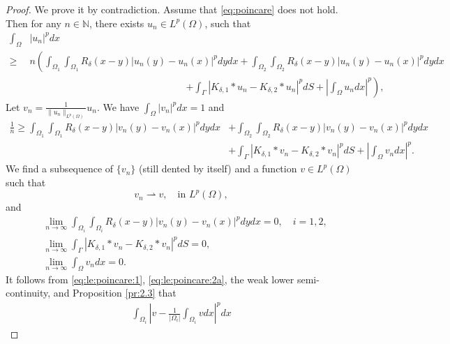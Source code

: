 \documentclass{article}
\theoremstyle{definition}
\begin{document}
\begin{proof}
  We prove it by contradiction. Assume that \eqref{eq:poincare} does not hold.
  Then for any $n\in\mathbb{N}$, there exists  $u_{n}\in L^p(\Omega)$, such that
  \begin{align*}
    \int_\Omega & |u_n|^pdx\\
    \geq &n
    \left(\int_{\Omega_1}\int_{\Omega_1}R_\delta(x-y)|u_{n}(y)-u_{n}(x)|^pdydx
    +\int_{\Omega_2}\int_{\Omega_2}R_\delta(x-y)|u_{n}(y)-u_{n}(x)|^pdydx\right.\\
    &\qquad\qquad\qquad\qquad\qquad\qquad\qquad\qquad
    \left.+\int_\Gamma\left|K_{\delta,1}\ast u_{n}-K_{\delta,2}\ast u_{n}\right|^pdS
    +\left|\int_{\Omega} u_ndx\right|^p \right),
  \end{align*}
  Let $v_{n}=\frac{1}{\|u_n\|_{L^p(\Omega)}} u_{n}$.
  We have $\int_{\Omega}|v_{n}|^pdx=1$
  and
    \begin{align*}
    \frac{1}{n}
    \geq
    \int_{\Omega_1}\int_{\Omega_1}R_\delta(x-y)|v_{n}(y)-v_{n}(x)|^pdydx
    &+\int_{\Omega_2}\int_{\Omega_2}R_\delta(x-y)|v_{n}(y)-v_{n}(x)|^pdydx\\
    &+\int_\Gamma\left|K_{\delta,1}\ast v_{n}-K_{\delta,2}\ast v_{n}\right|^pdS
    +\left|\int_{\Omega} v_ndx\right|^p.
  \end{align*}
  We find a subsequence of $\{v_{n}\}$ (still dented by itself) and a function $v\in L^p(\Omega)$ such that
  \begin{equation}\label{eq:le:poincare:1}
    v_{n} \rightharpoonup v, \quad \mbox{in } L^p(\Omega),
  \end{equation}
  and
  \begin{subequations}\label{eq:le:poincare:2}
  \begin{align}
    &\lim_{n\rightarrow\infty} \int_{\Omega_i}\int_{\Omega_i}R_\delta(x-y)|v_{n}(y)-v_{n}(x)|^pdydx=0,\quad i=1,2,\label{eq:le:poincare:2a}\\
    &\lim_{n\rightarrow\infty}
    \int_\Gamma\left|K_{\delta,1}\ast v_{n}-K_{\delta,2}\ast v_{n}\right|^pdS=0,\label{eq:le:poincare:2c}\\
    &\lim_{n\rightarrow\infty}
    \int_{\Omega} v_{n}dx=0. \label{eq:le:poincare:2d}
  \end{align}
  \end{subequations}
  It follows from \eqref{eq:le:poincare:1}, \eqref{eq:le:poincare:2a}, the weak lower semi-continuity, and Proposition \ref{pr:2.3} that
  \begin{align*}
    \int_{\Omega_i}\left|v-\frac{1}{|\Omega_i|}\int_{\Omega_i}vdx\right|^pdx

\end{align*}
\end{proof}
\end{document}

